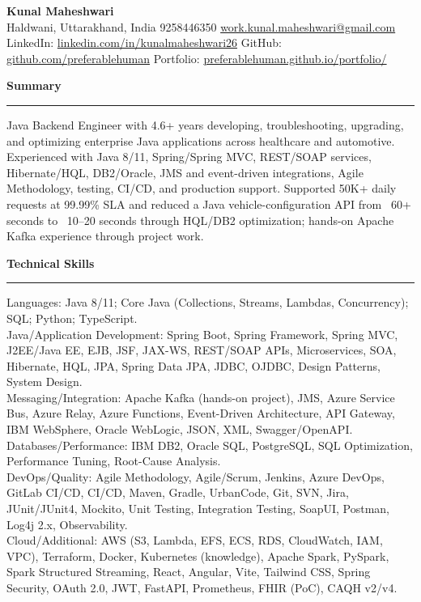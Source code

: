 \documentclass[10pt,letterpaper]{article}
\newcommand{\ressection}[1]{\vspace{3pt}\par\textbf{#1}\par\vspace{0.8pt}\hrule\vspace{1.7pt}}
\begin{document}
\pagestyle{empty}\raggedright\fontsize{10}{10.65}\selectfont

{\Large \textbf{Kunal Maheshwari}}\\
Haldwani, Uttarakhand, India \textbar{} 9258446350 \textbar{} \href{mailto:work.kunal.maheshwari@gmail.com}{work.kunal.maheshwari@gmail.com}\\
LinkedIn: \href{https://www.linkedin.com/in/kunalmaheshwari26}{linkedin.com/in/kunalmaheshwari26} \textbar{} GitHub: \href{https://github.com/preferablehuman}{github.com/preferablehuman} \textbar{} Portfolio: \href{https://preferablehuman.github.io/portfolio/}{preferablehuman.github.io/portfolio/}

\ressection{Summary}
Java Backend Engineer with 4.6+ years developing, troubleshooting, upgrading, and optimizing enterprise Java applications across healthcare and automotive. Experienced with Java 8/11, Spring/Spring MVC, REST/SOAP services, Hibernate/HQL, DB2/Oracle, JMS and event-driven integrations, Agile Methodology, testing, CI/CD, and production support. Supported 50K+ daily requests at 99.99\% SLA and reduced a Java vehicle-configuration API from ~60+ seconds to ~10--20 seconds through HQL/DB2 optimization; hands-on Apache Kafka experience through project work.

\ressection{Technical Skills}
Languages: Java 8/11; Core Java (Collections, Streams, Lambdas, Concurrency); SQL; Python; TypeScript.\\
Java/Application Development: Spring Boot, Spring Framework, Spring MVC, J2EE/Java EE, EJB, JSF, JAX-WS, REST/SOAP APIs, Microservices, SOA, Hibernate, HQL, JPA, Spring Data JPA, JDBC, OJDBC, Design Patterns, System Design.\\
Messaging/Integration: Apache Kafka (hands-on project), JMS, Azure Service Bus, Azure Relay, Azure Functions, Event-Driven Architecture, API Gateway, IBM WebSphere, Oracle WebLogic, JSON, XML, Swagger/OpenAPI.\\
Databases/Performance: IBM DB2, Oracle SQL, PostgreSQL, SQL Optimization, Performance Tuning, Root-Cause Analysis.\\
DevOps/Quality: Agile Methodology, Agile/Scrum, Jenkins, Azure DevOps, GitLab CI/CD, CI/CD, Maven, Gradle, UrbanCode, Git, SVN, Jira, JUnit/JUnit4, Mockito, Unit Testing, Integration Testing, SoapUI, Postman, Log4j 2.x, Observability.\\
Cloud/Additional: AWS (S3, Lambda, EFS, ECS, RDS, CloudWatch, IAM, VPC), Terraform, Docker, Kubernetes (knowledge), Apache Spark, PySpark, Spark Structured Streaming, React, Angular, Vite, Tailwind CSS, Spring Security, OAuth 2.0, JWT, FastAPI, Prometheus, FHIR (PoC), CAQH v2/v4.
\end{document}
